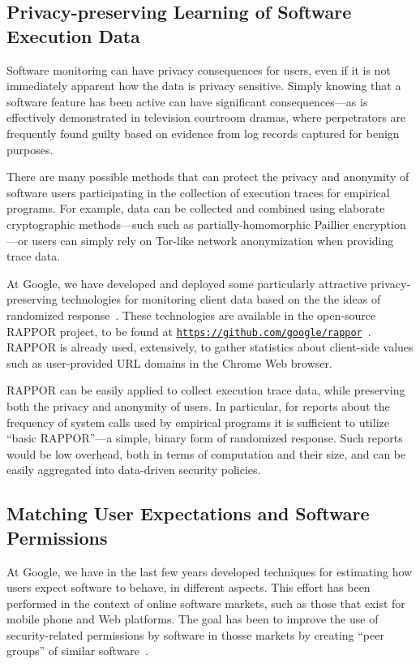 \documentclass{IEEEtran}
\begin{document}
\subsection{Privacy-preserving Learning of Software Execution Data}
Software monitoring can have privacy consequences for users,
even if it is not immediately apparent how the data is privacy sensitive.
Simply knowing that a software feature has been active can have significant consequences---as
is effectively demonstrated
in television courtroom dramas,
where perpetrators are frequently found guilty 
based on evidence from log records captured for benign purposes.


There are many possible methods 
that can protect the privacy and anonymity of software users
participating in the collection of execution traces for empirical programs.
For example, 
data can be collected and combined using elaborate cryptographic methods---such
such as partially-homomorphic Paillier encryption---or users can simply 
rely on Tor-like network anonymization
when providing trace data.

At Google,
we have developed and deployed
some particularly attractive 
privacy-preserving technologies for monitoring client data
based on
the the ideas of randomized response~\cite{rappor}.
These technologies are available in the open-source RAPPOR project,
to be found at \texttt{\url{https://github.com/google/rappor}}~\cite{rappor}.
RAPPOR is already used, extensively,
to gather statistics about client-side values
such as user-provided URL domains
in the Chrome Web browser.

RAPPOR
can be easily applied to collect execution trace data,
while preserving both the privacy and anonymity of users.
In particular,
for reports about the frequency of system calls used by empirical programs
it is sufficient to utilize ``basic RAPPOR''---a simple, binary form of randomized response.
Such reports would be low overhead, 
both in terms of computation and their size, 
and can be easily aggregated into data-driven security policies.


\subsection{Matching User Expectations and Software Permissions}
At Google,
we have in the last few years
developed techniques for estimating
how users expect software to behave,
in different aspects.
This effort has been performed in the context of online software markets,
such as those that exist for mobile phone and Web platforms.
The goal has been to improve the
use of security-related permissions by software in thosse markets
by creating ``peer groups'' of similar software~\cite{applesAndOranges}.
\end{document}
